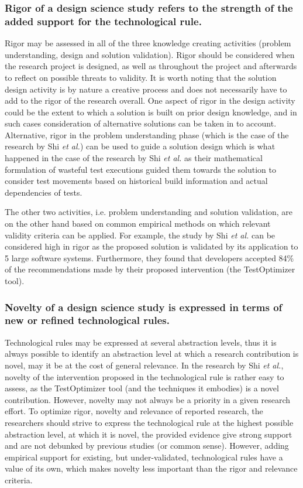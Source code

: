 \documentclass[graybox]{svmult}
\begin{document}
{\subsubsection{Rigor of a design science study refers to the strength of the added support for the technological rule.} Rigor may be assessed in all of the three knowledge creating activities (problem understanding, design and solution validation). 
Rigor should be considered when the research project is designed, as well as throughout the project and afterwards to reflect on possible threats to validity. 
It is worth noting that the solution design activity is by nature a creative process and does not necessarily have to add to the rigor of the research overall. One aspect of rigor in the design activity could be the extent to which a solution is built on prior design knowledge, and in such cases consideration of alternative solutions can be taken in to account. 
Alternative, rigor in the problem understanding phase (which is the case of the research by Shi \emph{et al.}) can be used to guide a solution design which is what happened in the case of the research by Shi \emph{et al.} as their mathematical formulation of wasteful test executions guided them towards the solution to consider test movements based on historical build information and actual dependencies of tests. 

The other two activities, i.e. problem understanding and solution validation, are on the other hand based on common empirical methods on which relevant validity criteria can be applied. For example, the study by Shi \emph{et al.} can be considered high in rigor as the proposed solution is validated by its application to 5 large software systems.  Furthermore, they found that developers accepted 84\% of the recommendations made by their proposed intervention (the TestOptimizer tool). 

\subsubsection{Novelty of a design science study is expressed in terms of new or refined technological rules.} Technological rules may be expressed at several abstraction levels, thus it is always possible to identify an abstraction level at which a research contribution is novel, may it be at the cost of general relevance.  In the research by Shi \emph{et al.}, novelty of the intervention proposed in the technological rule is rather easy to assess, as the TestOptimizer tool (and the techniques it embodies) is a novel contribution.  
However, novelty may not always be a priority in a given research effort.
To optimize rigor, novelty and relevance of reported research, the researchers should strive to express the technological rule at the highest possible abstraction level, at which it is novel, the provided evidence give strong support and are not debunked by previous studies (or common sense). However, adding empirical support for existing, but under-validated, technological rules have a value of its own, which makes novelty less important than the rigor and relevance criteria.


}
\end{document}
